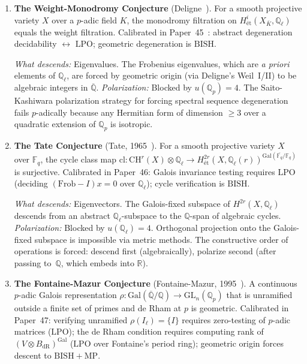 \documentclass[11pt]{article}
\theoremstyle{definition}
\theoremstyle{remark}
\newcommand{\Q}{\mathbb{Q}}
\newcommand{\R}{\mathbb{R}}
\newcommand{\Qbar}{\overline{\Q}}
\newcommand{\Qell}{\Q_\ell}
\newcommand{\Qp}{\Q_p}
\newcommand{\Fq}{\mathbb{F}_q}
\newcommand{\LPO}{\mathrm{LPO}}
\newcommand{\MP}{\mathrm{MP}}
\newcommand{\BISH}{\mathrm{BISH}}
\begin{document}
\begin{enumerate}
\item \textbf{The Weight-Monodromy Conjecture} (Deligne~\cite{Deligne1974,Deligne1980}). For a smooth projective variety $X$ over a $p$-adic field $K$, the monodromy filtration on $H^i_{\text{\'et}}(X_{\bar K}, \Qell)$ equals the weight filtration. Calibrated in Paper~45~\cite{Paper45}: abstract degeneration decidability $\leftrightarrow$ $\LPO$; geometric degeneration is $\BISH$.

\emph{What descends:} Eigenvalues. The Frobenius eigenvalues, which are \emph{a priori} elements of $\Qell$, are forced by geometric origin (via Deligne's Weil~I/II) to be algebraic integers in $\Qbar$. \emph{Polarization:} Blocked by $u(\Qp) = 4$. The Saito-Kashiwara polarization strategy for forcing spectral sequence degeneration fails $p$-adically because any Hermitian form of dimension $\geq 3$ over a quadratic extension of $\Qp$ is isotropic.

\item \textbf{The Tate Conjecture} (Tate, 1965~\cite{Tate1965}). For a smooth projective variety $X$ over $\Fq$, the cycle class map $\mathrm{cl} : \mathrm{CH}^r(X) \otimes \Qell \to H^{2r}_{\text{\'et}}(X, \Qell(r))^{\mathrm{Gal}(\bar{\Fq}/\Fq)}$ is surjective. Calibrated in Paper~46: Galois invariance testing requires $\LPO$ (deciding $(\mathrm{Frob} - I)x = 0$ over $\Qell$); cycle verification is $\BISH$.

\emph{What descends:} Eigenvectors. The Galois-fixed subspace of $H^{2r}(X, \Qell)$ descends from an abstract $\Qell$-subspace to the $\Q$-span of algebraic cycles. \emph{Polarization:} Blocked by $u(\Qell) = 4$. Orthogonal projection onto the Galois-fixed subspace is impossible via metric methods. The constructive order of operations is forced: descend first (algebraically), polarize second (after passing to~$\Q$, which embeds into $\R$).

\item \textbf{The Fontaine-Mazur Conjecture} (Fontaine-Mazur, 1995~\cite{FontaineMazur1995}). A continuous $p$-adic Galois representation $\rho : \mathrm{Gal}(\Qbar/\Q) \to \mathrm{GL}_n(\Qp)$ that is unramified outside a finite set of primes and de Rham at $p$ is geometric. Calibrated in Paper~47: verifying unramified $\rho(I_\ell) = \{I\}$ requires zero-testing of $p$-adic matrices ($\LPO$); the de Rham condition requires computing rank of $(V \otimes B_{\mathrm{dR}})^{\mathrm{Gal}}$ ($\LPO$ over Fontaine's period ring); geometric origin forces descent to $\BISH + \MP$.


\end{enumerate}
\end{document}
